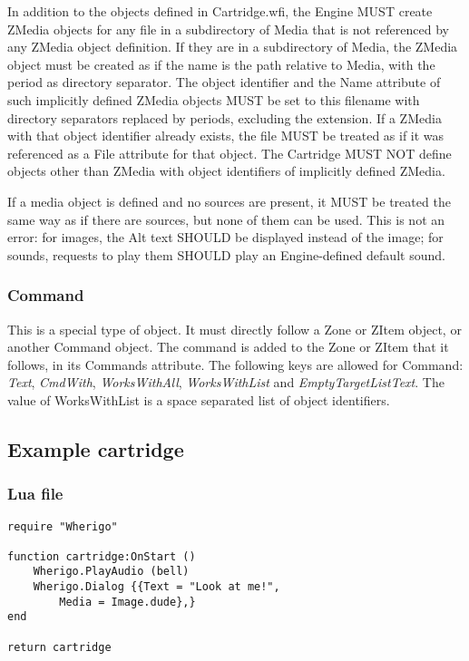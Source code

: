 \documentclass{article}
\begin{document}
In addition to the objects defined in Cartridge.wfi, the Engine MUST create
ZMedia objects for any file in a subdirectory of Media that is not referenced
by any ZMedia object definition.  If they are in a subdirectory of Media, the
ZMedia object must be created as if the name is the path relative to Media,
with the period as directory separator.  The object identifier and the Name
attribute of such implicitly defined ZMedia objects MUST be set to this
filename with directory separators replaced by periods, excluding the
extension.  If a ZMedia with that object identifier already exists, the file
MUST be treated as if it was referenced as a File attribute for that object.
The Cartridge MUST NOT define objects other than ZMedia with object identifiers
of implicitly defined ZMedia.

If a media object is defined and no sources are present, it MUST be treated the
same way as if there are sources, but none of them can be used. This is not an
error: for images, the Alt text SHOULD be displayed instead of the image; for
sounds, requests to play them SHOULD play an Engine-defined default sound.

\subsubsection{Command}
This is a special type of object.  It must directly follow a Zone or ZItem object, or another Command object.  The command is added to the Zone or ZItem that it follows, in its Commands attribute.  The following keys are allowed for Command: \textit{Text}, \textit{CmdWith}, \textit{WorksWithAll}, \textit{WorksWithList} and \textit{EmptyTargetListText}.  The value of WorksWithList is a space separated list of object identifiers.

\subsection{Example cartridge}
\subsubsection{Lua file}
\noindent\begin{lstlisting}
require "Wherigo"

function cartridge:OnStart ()
	Wherigo.PlayAudio (bell)
	Wherigo.Dialog {{Text = "Look at me!",
		Media = Image.dude},}
end

return cartridge
\end{lstlisting}
\end{document}
